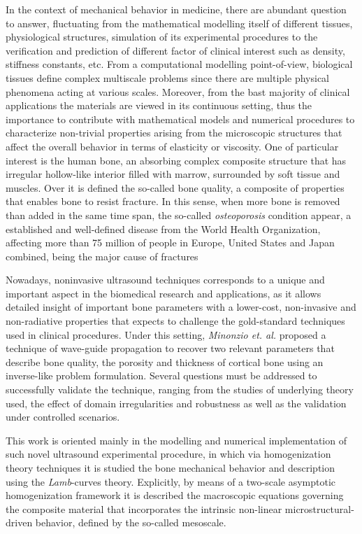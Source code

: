 \begin{intro}
In the context of mechanical behavior in medicine, there are abundant question to answer, fluctuating from the mathematical modelling itself of different tissues, physiological structures, simulation of its experimental procedures to the verification and prediction of different factor of clinical interest such as density, stiffness constants, etc. From a computational modelling point-of-view, biological tissues define complex multiscale problems since there are multiple physical phenomena acting at various scales. Moreover, from the bast majority of clinical applications the materials are viewed in its continuous setting, thus the importance to contribute with mathematical models and numerical procedures to characterize non-trivial properties arising from the microscopic structures that affect the overall behavior in terms of elasticity or viscosity.
One of particular interest is the human bone, an absorbing complex composite structure that has irregular hollow-like interior filled with marrow, surrounded by soft tissue and muscles. Over it is defined the so-called bone quality, a composite of properties that enables bone to resist fracture. In this sense, when more bone is removed than added in the same time span, the so-called \textit{osteoporosis} condition appear, a established and well-defined disease from the World Health Organization, affecting more than 75 million of people in Europe, United States and Japan combined, being the major cause of fractures

Nowadays, noninvasive ultrasound techniques corresponds to a unique and important aspect in the biomedical research and applications, as it allows detailed insight of important bone parameters with a lower-cost, non-invasive and non-radiative properties that expects to challenge the gold-standard techniques used in clinical procedures. Under this setting, \textit{Minonzio et. al.} \cite{Minonzio2018} proposed a technique of wave-guide propagation to recover two relevant parameters that describe bone quality, the porosity and thickness of cortical bone using an inverse-like problem formulation. Several questions must be addressed to successfully validate the technique, ranging from the studies of underlying theory used, the effect of domain irregularities and robustness as well as the validation under controlled scenarios.


This work is oriented mainly in the modelling and numerical implementation of such novel ultrasound experimental procedure, in which via homogenization theory techniques it is studied the bone mechanical behavior and  description using the \textit{Lamb}-curves theory. Explicitly, by means of a two-scale asymptotic homogenization framework it is described the macroscopic equations governing the composite material that incorporates the intrinsic non-linear microstructural-driven behavior, defined by the so-called mesoscale.


\end{intro}

